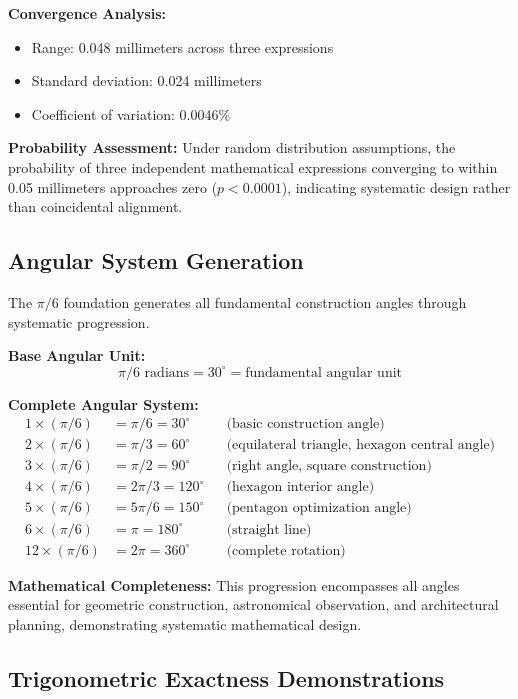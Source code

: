 \documentclass[11pt]{article}
\begin{document}
\textbf{Convergence Analysis:}
\begin{itemize}
    \item Range: 0.048 millimeters across three expressions
    \item Standard deviation: 0.024 millimeters
    \item Coefficient of variation: 0.0046\%
\end{itemize}

\textbf{Probability Assessment:}
Under random distribution assumptions, the probability of three independent mathematical expressions converging to within 0.05 millimeters approaches zero ($p < 0.0001$), indicating systematic design rather than coincidental alignment.

\subsection{Angular System Generation}
The $\pi/6$ foundation generates all fundamental construction angles through systematic progression.

\textbf{Base Angular Unit:}
\[ \pi/6 \text{ radians} = 30^\circ = \text{fundamental angular unit} \]

\textbf{Complete Angular System:}
\begin{align*}
1 \times (\pi/6) &= \pi/6 = 30^\circ && \text{(basic construction angle)} \\
2 \times (\pi/6) &= \pi/3 = 60^\circ && \text{(equilateral triangle, hexagon central angle)} \\
3 \times (\pi/6) &= \pi/2 = 90^\circ && \text{(right angle, square construction)} \\
4 \times (\pi/6) &= 2\pi/3 = 120^\circ && \text{(hexagon interior angle)} \\
5 \times (\pi/6) &= 5\pi/6 = 150^\circ && \text{(pentagon optimization angle)} \\
6 \times (\pi/6) &= \pi = 180^\circ && \text{(straight line)} \\
12 \times (\pi/6) &= 2\pi = 360^\circ && \text{(complete rotation)}
\end{align*}

\textbf{Mathematical Completeness:} This progression encompasses all angles essential for geometric construction, astronomical observation, and architectural planning, demonstrating systematic mathematical design.

\subsection{Trigonometric Exactness Demonstrations}
\end{document}
